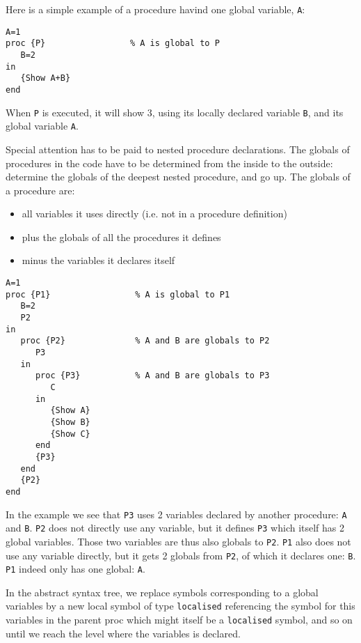 \documentclass[a4paper]{memoir}
\begin{document}
Here is a simple example of a procedure havind one global variable,
\lstinline!A!:
\begin{lstlisting}
A=1
proc {P}                 % A is global to P
   B=2
in
   {Show A+B}
end
\end{lstlisting}

When \lstinline!P! is executed, it will show 3, using its locally declared
variable \lstinline!B!, and its global variable \lstinline!A!.

Special attention has to be paid to nested procedure declarations.
The globals of procedures in the code have to be determined from the inside to the outside: determine the globals of the deepest nested procedure, and go up. 
The globals of a procedure are:
\begin{itemize}
  \item all variables it uses directly (i.e. not in a procedure definition)
  \item plus the globals of all the procedures it defines
  \item minus the variables it declares itself
\end{itemize}


\begin{lstlisting}
A=1
proc {P1}                 % A is global to P1
   B=2
   P2
in
   proc {P2}              % A and B are globals to P2
      P3 
   in
      proc {P3}           % A and B are globals to P3
         C
      in
         {Show A}
         {Show B}
         {Show C}
      end
      {P3}
   end
   {P2}
end
\end{lstlisting}


In the example we see that \lstinline!P3! uses 2 variables declared by another procedure: \lstinline!A! and \lstinline!B!. 
\lstinline!P2! does not directly use any variable, but it defines \lstinline!P3! which itself has 2 global variables. Those two variables are thus also globals to \lstinline!P2!.
\lstinline!P1! also does not use any variable directly, but it gets 2 globals from \lstinline!P2!, of which it declares one: \lstinline!B!. \lstinline!P1! indeed only has one global: \lstinline!A!.

In the abstract syntax tree, we replace symbols corresponding to a global
variables by a new local symbol of type \lstinline!localised! referencing the
symbol for this variables in the parent proc which might itself be a
\lstinline!localised! symbol, and so on until we reach the level where the variables is declared.

\end{document}
